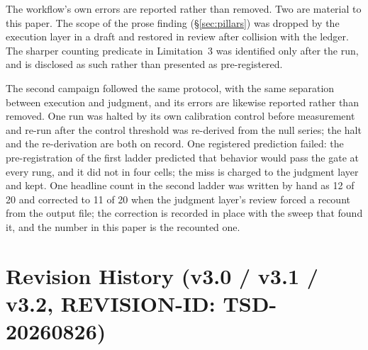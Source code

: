 \documentclass[11pt]{article}
\begin{document}
The workflow's own errors are reported rather than removed. Two are
material to this paper. The scope of the prose finding
(\S\ref{sec:pillars}) was dropped by the execution layer in a draft and
restored in review after collision with the ledger. The sharper counting
predicate in Limitation~3 was identified only after the run, and is
disclosed as such rather than presented as pre-registered.

The second campaign followed the same protocol, with the same separation between execution and judgment, and its errors are likewise reported rather than removed. One run was halted by its own calibration control before measurement and re-run after the control threshold was re-derived from the null series; the halt and the re-derivation are both on record. One registered prediction failed: the pre-registration of the first ladder predicted that behavior would pass the gate at every rung, and it did not in four cells; the miss is charged to the judgment layer and kept. One headline count in the second ladder was written by hand as 12 of 20 and corrected to 11 of 20 when the judgment layer's review forced a recount from the output file; the correction is recorded in place with the sweep that found it, and the number in this paper is the recounted one.


\section*{Revision History (v3.0 / v3.1 / v3.2, REVISION-ID: TSD-20260826)}
\label{sec:revision}
\end{document}
